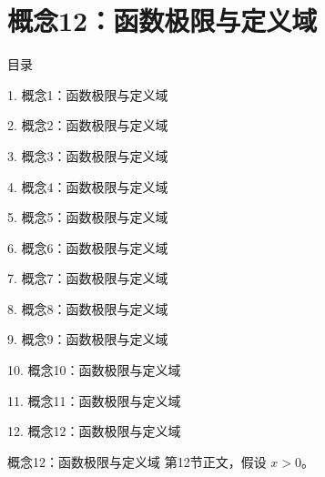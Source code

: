 \documentclass[aspectratio=169,10pt,fontset=fandol]{ctexbeamer}
\begin{document}
\section{概念12：函数极限与定义域}
\begin{frame}[t,fragile]{目录}
\small
{\color{black}\small 1. 概念1：函数极限与定义域\par}\vspace{0.22em}
{\color{black}\small 2. 概念2：函数极限与定义域\par}\vspace{0.22em}
{\color{black}\small 3. 概念3：函数极限与定义域\par}\vspace{0.22em}
{\color{black}\small 4. 概念4：函数极限与定义域\par}\vspace{0.22em}
{\color{black}\small 5. 概念5：函数极限与定义域\par}\vspace{0.22em}
{\color{black}\small 6. 概念6：函数极限与定义域\par}\vspace{0.22em}
{\color{black}\small 7. 概念7：函数极限与定义域\par}\vspace{0.22em}
{\color{black}\small 8. 概念8：函数极限与定义域\par}\vspace{0.22em}
{\color{black}\small 9. 概念9：函数极限与定义域\par}\vspace{0.22em}
{\color{black}\small 10. 概念10：函数极限与定义域\par}\vspace{0.22em}
{\color{black}\small 11. 概念11：函数极限与定义域\par}\vspace{0.22em}
{\color{blue}\small 12. 概念12：函数极限与定义域\par}\vspace{0.22em}
\end{frame}
\begin{frame}[t,fragile]{概念12：函数极限与定义域}
\normalsize
{\normalsize
第12节正文，假设 $x>0$。
}
\end{frame}
\end{document}
